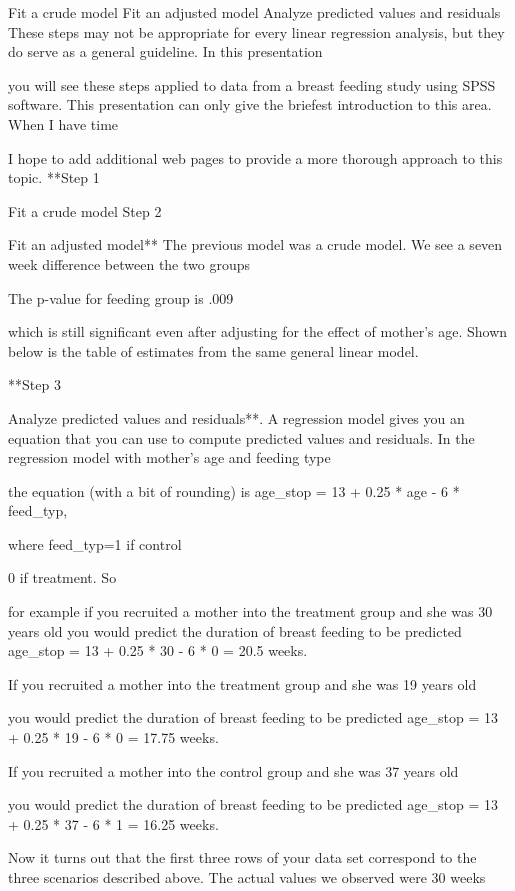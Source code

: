 \documentclass[
  letterpaper,
  DIV=11,
  numbers=noendperiod]{scrreprt}
\begin{document}
Fit a crude model Fit an adjusted model Analyze predicted values and
residuals These steps may not be appropriate for every linear regression
analysis, but they do serve as a general guideline. In this presentation

you will see these steps applied to data from a breast feeding study
using SPSS software. This presentation can only give the briefest
introduction to this area. When I have time

I hope to add additional web pages to provide a more thorough approach
to this topic. **Step 1

Fit a crude model\textbf{ }Step 2

Fit an adjusted model** The previous model was a crude model. We see a
seven week difference between the two groups

The p-value for feeding group is .009

which is still significant even after adjusting for the effect of
mother's age. Shown below is the table of estimates from the same
general linear model.

**Step 3

Analyze predicted values and residuals**. A regression model gives you
an equation that you can use to compute predicted values and residuals.
In the regression model with mother's age and feeding type

the equation (with a bit of rounding) is age\_stop = 13 + 0.25 * age - 6
* feed\_typ,

where feed\_typ=1 if control

0 if treatment. So

for example if you recruited a mother into the treatment group and she
was 30 years old you would predict the duration of breast feeding to be
predicted age\_stop = 13 + 0.25 * 30 - 6 * 0 = 20.5 weeks.

If you recruited a mother into the treatment group and she was 19 years
old

you would predict the duration of breast feeding to be predicted
age\_stop = 13 + 0.25 * 19 - 6 * 0 = 17.75 weeks.

If you recruited a mother into the control group and she was 37 years
old

you would predict the duration of breast feeding to be predicted
age\_stop = 13 + 0.25 * 37 - 6 * 1 = 16.25 weeks.

Now it turns out that the first three rows of your data set correspond
to the three scenarios described above. The actual values we observed
were 30 weeks
\end{document}
